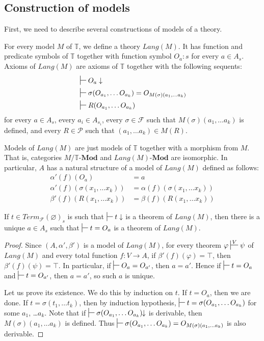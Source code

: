 \documentclass[reqno]{amsart}
\theoremstyle{definition}
\theoremstyle{remark}
\newcommand{\cat}[1]{\mathbf{#1}}
\newcommand{\Mod}[1]{#1\text{-}\cat{Mod}}
\numberwithin{figure}{section}
\begin{document}
\subsection{Construction of models}

First, we need to describe several constructions of models of a theory.

For every model $M$ of $\mathbb{T}$, we define a theory $Lang(M)$.
It has function and predicate symbols of $\mathbb{T}$ together with function symbol $O_a : s$ for every $a \in A_s$.
Axioms of $Lang(M)$ are axioms of $\mathbb{T}$ together with the following sequents:
\begin{align*}
& \sststile{}{} O_a \downarrow \\
& \sststile{}{} \sigma(O_{a_1}, \ldots O_{a_k}) = O_{M(\sigma)(a_1, \ldots a_k)} \\
& \sststile{}{} R(O_{a_1}, \ldots O_{a_k})
\end{align*}
for every $a \in A_s$, every $a_i \in A_{s_i}$,
every $\sigma \in \mathcal{F}$ such that $M(\sigma)(a_1, \ldots a_k)$ is defined,
and every $R \in \mathcal{P}$ such that $(a_1, \ldots a_k) \in M(R)$.

Models of $Lang(M)$ are just models of $\mathbb{T}$ together with a morphism from $M$.
That is, categories $M/\Mod{\mathbb{T}}$ and $\Mod{Lang(M)}$ are isomorphic.
In particular, $A$ has a natural structure of a model of $Lang(M)$ defined as follows:
\begin{align*}
\alpha'(f)(O_a) & = a \\
\alpha'(f)(\sigma(x_1, \ldots x_k)) & = \alpha(f)(\sigma(x_1, \ldots x_k)) \\
\beta'(f)(R(x_1, \ldots x_k)) & = \beta(f)(R(x_1, \ldots x_k))
\end{align*}

\begin{lem}[cl-term]
If $t \in Term_\mathcal{F}(\varnothing)_s$ is such that $\sststile{}{} t \downarrow$ is a theorem of $Lang(M)$,
    then there is a unique $a \in A_s$ such that $\sststile{}{} t = O_a$ is a theorem of $Lang(M)$.
\end{lem}
\begin{proof}
Since $(A,\alpha',\beta')$ is a model of $Lang(M)$, for every theorem $\varphi \sststile{}{V} \psi$ of $Lang(M)$
    and every total function $f : V \to A$, if $\beta'(f)(\varphi) = \top$, then $\beta'(f)(\psi) = \top$.
In particular, if $\sststile{}{} O_a = O_{a'}$, then $a = a'$.
Hence if $\sststile{}{} t = O_a$ and $\sststile{}{} t = O_{a'}$, then $a = a'$, so such $a$ is unique.

Let us prove its existence.
We do this by induction on $t$.
If $t = O_a$, then we are done.
If $t = \sigma(t_1, \ldots t_k)$, then by induction hypothesis, $\sststile{}{} t = \sigma(O_{a_1}, \ldots O_{a_k})$ for some $a_1$, \ldots $a_k$.
Note that if $\sststile{}{} \sigma(O_{a_1}, \ldots O_{a_k})\!\!\downarrow$ is derivable, then $M(\sigma)(a_1, \ldots a_k)$ is defined.
Thus $\sststile{}{} \sigma(O_{a_1}, \ldots O_{a_k}) = O_{M(\sigma)(a_1, \ldots a_k)}$ is also derivable.
\end{proof}
\end{document}
